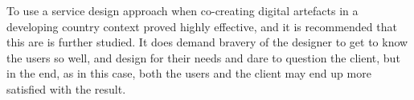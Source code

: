 To use a service design approach when co-creating digital artefacts in a developing country context proved highly effective, and it is recommended that this are is further studied. It does demand bravery of the designer to get to know the users so well, and design for their needs and dare to question the client, but in the end, as in this case, both the users and the client may end up more satisfied with the result.


